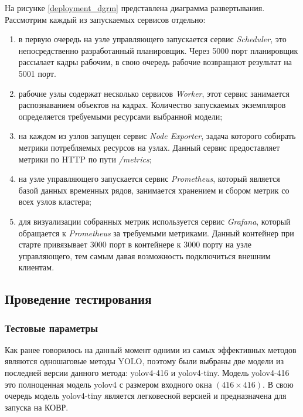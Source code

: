 На рисунке \ref{deployment_dgrm} представлена диаграмма развертывания. Рассмотрим каждый из запускаемых сервисов отдельно:


\begin{enumerate}
\item в первую очередь на узле управляющего запускается сервис \emph{Scheduler}, это непосредственно разработанный 
планировщик. Через 5000 порт планировщик рассылает кадры рабочим, в свою очередь рабочие возвращают результат на 
5001 порт.
\item рабочие узлы содержат несколько сервисов \emph{Worker}, этот сервис занимается распознаванием объектов на кадрах. 
Количество запускаемых экземпляров определяется требуемыми ресурсами выбранной модели;
\item на каждом из узлов запущен сервис \emph{Node Exporter}, задача которого собирать метрики потребляемых ресурсов
на узлах. Данный сервис предоставляет метрики по HTTP по пути \emph{/metrics};
\item на узле управляющего запускается сервис \emph{Prometheus}, который является базой данных временных рядов, 
занимается хранением и сбором метрик со всех узлов кластера;
\item для визуализации собранных метрик используется сервис \emph{Grafana}, который обращается к \emph{Prometheus} за 
требуемыми метриками. Данный контейнер при старте привязывает 3000 порт в контейнере к 3000 порту на узле управляющего, 
тем самым давая возможность подключиться внешним клиентам.
\end{enumerate}

\subsection{Проведение тестирования}

\subsubsection{Тестовые параметры}

Как ранее говорилось на данный момент одними из самых эффективных методов являются одношаговые методы YOLO, поэтому 
были выбраны две модели из последней версии данного метода: yolov4-416 и yolov4-tiny. Модель yolov4-416 это полноценная
модель yolov4 с размером входного окна $(416 \times 416)$. В свою очередь модель yolov4-tiny является легковесной версией 
и предназначена для запуска на КОВР.


